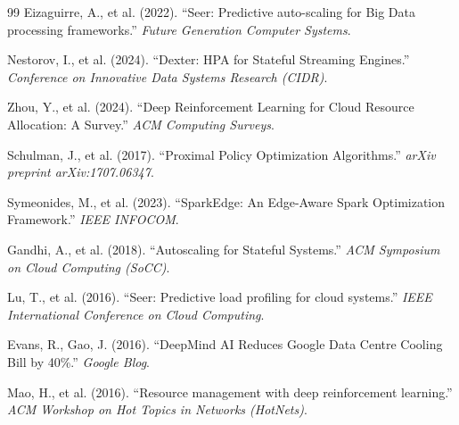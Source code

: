 \documentclass[12pt, a4paper]{report}
\begin{document}
\begin{thebibliography}{99}
Eizaguirre, A., et al. (2022). ``Seer: Predictive auto-scaling for Big Data processing frameworks.'' \textit{Future Generation Computer Systems}.

Nestorov, I., et al. (2024). ``Dexter: HPA for Stateful Streaming Engines.'' \textit{Conference on Innovative Data Systems Research (CIDR)}.

Zhou, Y., et al. (2024). ``Deep Reinforcement Learning for Cloud Resource Allocation: A Survey.'' \textit{ACM Computing Surveys}.

Schulman, J., et al. (2017). ``Proximal Policy Optimization Algorithms.'' \textit{arXiv preprint arXiv:1707.06347}.

Symeonides, M., et al. (2023). ``SparkEdge: An Edge-Aware Spark Optimization Framework.'' \textit{IEEE INFOCOM}.

Gandhi, A., et al. (2018). ``Autoscaling for Stateful Systems.'' \textit{ACM Symposium on Cloud Computing (SoCC)}.

Lu, T., et al. (2016). ``Seer: Predictive load profiling for cloud systems.'' \textit{IEEE International Conference on Cloud Computing}.

Evans, R., Gao, J. (2016). ``DeepMind AI Reduces Google Data Centre Cooling Bill by 40\%.'' \textit{Google Blog}.

Mao, H., et al. (2016). ``Resource management with deep reinforcement learning.'' \textit{ACM Workshop on Hot Topics in Networks (HotNets)}.

\end{thebibliography}
\end{document}
